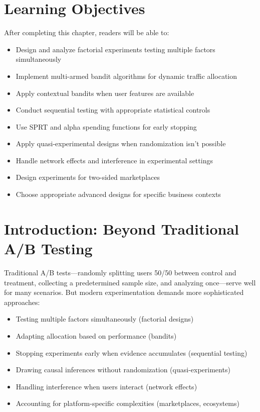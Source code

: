 
\section{Learning Objectives}

After completing this chapter, readers will be able to:
\begin{itemize}
    \item Design and analyze factorial experiments testing multiple factors simultaneously
    \item Implement multi-armed bandit algorithms for dynamic traffic allocation
    \item Apply contextual bandits when user features are available
    \item Conduct sequential testing with appropriate statistical controls
    \item Use SPRT and alpha spending functions for early stopping
    \item Apply quasi-experimental designs when randomization isn't possible
    \item Handle network effects and interference in experimental settings
    \item Design experiments for two-sided marketplaces
    \item Choose appropriate advanced designs for specific business contexts
\end{itemize}

\section{Introduction: Beyond Traditional A/B Testing}

Traditional A/B tests—randomly splitting users 50/50 between control and treatment, collecting a predetermined sample size, and analyzing once—serve well for many scenarios. But modern experimentation demands more sophisticated approaches:

\begin{itemize}
    \item Testing multiple factors simultaneously (factorial designs)
    \item Adapting allocation based on performance (bandits)
    \item Stopping experiments early when evidence accumulates (sequential testing)
    \item Drawing causal inferences without randomization (quasi-experiments)
    \item Handling interference when users interact (network effects)
    \item Accounting for platform-specific complexities (marketplaces, ecosystems)
\end{itemize}

